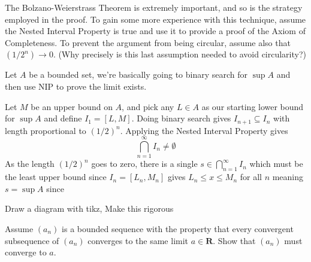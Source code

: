 \begin{solution}
\end{solution}

\begin{exercise}
  The Bolzano-Weierstrass Theorem is extremely important, and so is the strategy employed in the proof. To gain some more experience with this technique, assume the Nested Interval Property is true and use it to provide a proof of the Axiom of Completeness. To prevent the argument from being circular, assume also that $\left(1 / 2^{n}\right) \rightarrow 0$. (Why precisely is this last assumption needed to avoid circularity?)
\end{exercise}

\begin{solution}
  Let $A$ be a bounded set, we're basically going to binary search for $\sup A$ and then use NIP to prove the limit exists.

  Let $M$ be an upper bound on $A$, and pick any $L \in A$ as our starting lower bound for $\sup A$ and define $I_1 = [L, M]$. Doing binary search gives $I_{n+1} \subseteq I_n$ with length proportional to $(1/2)^n$. Applying the Nested Interval Property gives
  $$
  \bigcap_{n=1}^\infty I_n \ne \emptyset
  $$
  As the length $(1/2)^n$ goes to zero, there is a single $s \in \bigcap_{n=1}^\infty I_n$ which must be the least upper bound since $I_n = [L_n, M_n]$ gives $L_n \le x \le M_n$ for all $n$ meaning $s = \sup A$ since

  \TODO Draw a diagram with tikz, Make this rigorous
\end{solution}

\begin{exercise}
  Assume $\left(a_{n}\right)$ is a bounded sequence with the property that every convergent subsequence of $\left(a_{n}\right)$ converges to the same limit $a \in \mathbf{R}$. Show that $\left(a_{n}\right)$ must converge to $a$.
\end{exercise}


